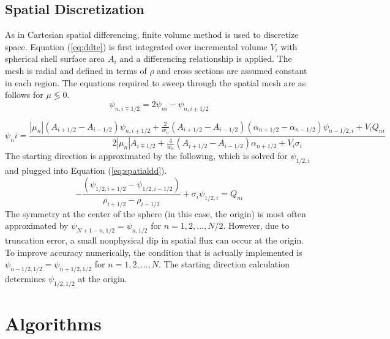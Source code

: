 \documentclass[11pt, oneside]{article}   	%
\begin{document}
\subsection{Spatial Discretization}

As in Cartesian spatial differencing, finite volume method is used to discretize space. Equation (\ref{eq:ddte}) is first integrated over incremental volume $V_i$ with spherical shell surface area $A_i$ and a differencing relationship is applied. The mesh is radial and defined in terms of $\rho$ and cross sections are assumed constant in each region. The equations required to sweep through the spatial mesh are as follows for $\mu \lessgtr 0$.
\newline
\begin{equation}
\psi_{n,i \mp 1/2}=2\psi_{ni} - \psi_{n,i \pm 1/2} 
\end{equation}

\begin{equation}\label{eq:spatialdd}
\psi_ni = \frac{\left| \mu_n \right| \left(A_{i+1/2}-A_{i-1/2}\right)\psi_{n,i \pm 1/2}+
\frac{2}{w_n}\left(A_{i+1/2}-A_{i-1/2}\right)\left(\alpha_{n+1/2}-\alpha_{n-1/2}\right)\psi_{n-1/2,i}+V_i Q_{ni}}
{2\left| \mu_n \right| A_{i \mp 1/2} + \frac{4}{w_n}\left(A_{i+1/2}-A_{i-1/2}\right)\alpha_{n+1/2}+V_i\sigma_i}
\end{equation}
\newline
The starting direction is approximated by the following, which is solved for $\psi_{1/2,i}$ and plugged into Equation (\ref{eq:spatialdd}).
\newline
\begin{equation}
-\frac{\left(\psi_{1/2, i+1/2} - \psi_{1/2, i-1/2}\right)}{\rho_{i+1/2}-\rho_{i-1/2}}+\sigma_i\psi_{1/2,i}=Q_{ni}
\end{equation}
\newline
The symmetry at the center of the sphere (in this case, the origin) is most often approximated by $\psi_{N+1-n, 1/2} = \psi_{n,1/2}$ for $n=1, 2, \dots, N/2$. However, due to truncation error, a small nonphysical dip in spatial flux can occur at the origin. To improve accuracy numerically, the condition that is actually implemented is $\psi_{n-1/2, 1/2} = \psi_{n+1/2, 1/2}$ for $n=1, 2, \dots, N$. The starting direction calculation determines $\psi_{1/2, 1/2}$ at the origin.

\section{Algorithms}
\end{document}
